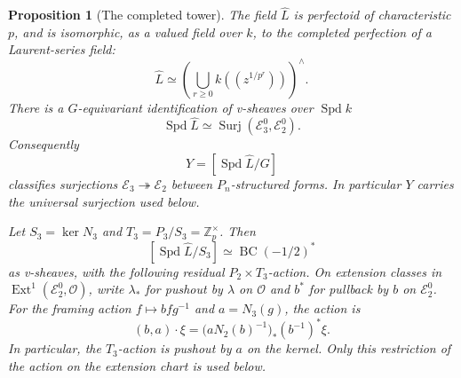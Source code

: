 \documentclass[11pt]{article}
\numberwithin{equation}{section}
\newtheorem{proposition}[theorem]{Proposition}
\theoremstyle{definition}
\theoremstyle{remark}
\begin{document}
\begin{proposition}[The completed tower]\label{prop:tower}
The field $\widehat L$ is perfectoid of characteristic $p$, and is
isomorphic, as a valued field over $k$, to the completed perfection of a
Laurent-series field:
\[
 \widehat L\simeq
 \left(\bigcup_{r\ge0}k((z^{1/p^r}))\right)^{\wedge}.
\]
There is a $G$-equivariant identification of v-sheaves over $\operatorname{Spd} k$
\[
 \operatorname{Spd}\widehat L\simeq
 \operatorname{Surj}(\mathcal E_3^0,\mathcal E_2^0).
\]
Consequently
\[
 Y=[\operatorname{Spd}\widehat L/G]
\]
classifies surjections $\mathcal E_3\twoheadrightarrow\mathcal E_2$
between $P_n$-structured forms.  In particular $Y$ carries the universal
surjection used below.

Let $S_3=\ker N_3$ and $T_3=P_3/S_3=\mathbb Z_p^{\times}$.  Then
\[
 [\operatorname{Spd}\widehat L/S_3]
 \simeq\operatorname{BC}(-1/2)^*
\]
as v-sheaves, with the following residual $P_2\times T_3$-action.
On extension classes in $\operatorname{Ext}^1(\mathcal E_2^0,\mathcal O)$,
write $\lambda_*$ for pushout by $\lambda$ on $\mathcal O$ and $b^*$ for
pullback by $b$ on $\mathcal E_2^0$.  For the framing action
$f\mapsto bfg^{-1}$ and $a=N_3(g)$, the action is
\[
 (b,a)\cdot\xi
   =\bigl(aN_2(b)^{-1}\bigr)_*(b^{-1})^*\xi.
\]
In particular, the $T_3$-action is pushout by $a$ on the kernel.
Only this restriction of the action on the extension chart is used below.
\end{proposition}
\end{document}
